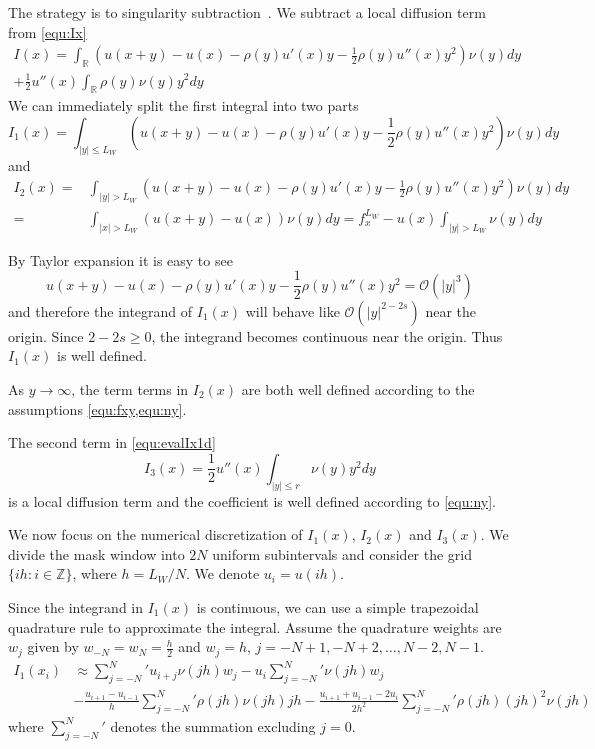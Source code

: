\documentclass[3p,,preprint,12pt]{elsarticle}
\newcommand{\RR}[0]{\mathbb{R}}
\theoremstyle{definition}
\begin{document}
The strategy is to singularity subtraction~\cite{minden2018simple}. We subtract a local diffusion term from \cref{equ:Ix}
\begin{multline}\label{equ:evalIx1d}
	I(x) = \int_{\RR}(u(x+y)-u(x)-\rho(y)u'(x)y- \frac{1}{2}\rho(y)u''(x)y^2 )\nu(y)dy \\
	+ \frac{1}{2}u''(x)\int_\RR \rho(y)\nu(y)y^2 dy
\end{multline}
We can immediately split the first integral into two parts
\begin{equation}
	I_1(x) = \int_{|y|\leq L_W}(u(x+y)-u(x)-\rho(y)u'(x)y- \frac{1}{2}\rho(y)u''(x)y^2 )\nu(y)dy
\end{equation}
and
\begin{align}
	I_2(x) =& \int_{|y|> L_W}(u(x+y)-u(x)-\rho(y)u'(x)y- \frac{1}{2}\rho(y)u''(x)y^2 )\nu(y)dy\\
	 = &\int_{|x|> L_W}(u(x+y)-u(x) )\nu(y)dy = f_x^{L_W} - u(x)\int_{|y|> L_W}\nu(y)dy
\end{align}

By Taylor expansion it is easy to see
\begin{equation}
	u(x+y)-u(x)-\rho(y)u'(x)y- \frac{1}{2}\rho(y)u''(x)y^2 =\mathcal{O}(|y|^3)
\end{equation}
and therefore the integrand of $I_1(x)$ will behave like $\mathcal{O}(|y|^{2-2s})$ near the origin. Since $2-2s\geq 0$, the integrand becomes continuous near the origin. Thus $I_1(x)$ is well defined.   

As $y\rightarrow \infty$, the term terms in $I_2(x)$ are both well defined according to the assumptions \cref{equ:fxy,equ:ny}. 

The second term in \cref{equ:evalIx1d} 
\begin{equation}
	I_3(x) = \frac{1}{2}u''(x)\int_{|y|\leq r}\nu(y)y^2 dy
\end{equation}
is a local diffusion term and the coefficient is well defined according to \cref{equ:ny}.

We now focus on the numerical discretization of $I_1(x)$, $I_2(x)$ and $I_3(x)$. We divide the mask window into $2N$ uniform subintervals and consider the grid $\{ih:i\in\mathbb{Z} \}$, where $h = L_W/N$. We denote $u_i = u(ih)$.

Since the integrand in $I_1(x)$ is continuous, we can use a simple trapezoidal quadrature rule to approximate the integral. Assume the quadrature weights are $w_j$ given by $w_{-N}=w_N = \frac{h}{2}$ and $w_j=h$, $j=-N+1, -N+2, \ldots, N-2, N-1$.
\begin{equation}\label{equ:I1approx}
  \begin{aligned}
	I_1(x_i) &\approx {\sum\limits_{j =  - N}^N}' {{u_{i + j}}\nu(jh){w_j}}  - {u_i}{\sum\limits_{j =  - N}^N}' {\nu(jh){w_j}} \\
	& - \frac{{{u_{i + 1}} - {u_{i - 1}}}}{h}{\sum\limits_{j =  - N}^N}' {\rho (jh)\nu(jh)jh}  - \frac{{{u_{i + 1}} + {u_{i - 1}} - 2{u_i}}}{{2{h^2}}}{\sum\limits_{j =  - N}^N}' {\rho (jh){{(jh)}^2}\nu(jh)} 
\end{aligned}
\end{equation}
where ${\sum\limits_{j =  - N}^N}'$ denotes the summation excluding $j=0$. 
\end{document}
